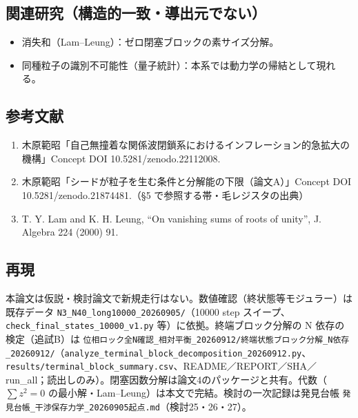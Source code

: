 \documentclass[
  a4paper,
]{ltjsarticle}
\providecommand{\tightlist}{%
  \setlength{\itemsep}{0pt}\setlength{\parskip}{0pt}}
\begin{document}
\subsection{関連研究（構造的一致・導出元でない）}\label{ux95a2ux9023ux7814ux7a76ux69cbux9020ux7684ux4e00ux81f4ux5c0eux51faux5143ux3067ux306aux3044}

\begin{itemize}
\tightlist
\item
  消失和（Lam--Leung）：ゼロ閉塞ブロックの素サイズ分解。
\item
  同種粒子の識別不可能性（量子統計）：本系では動力学の帰結として現れる。
\end{itemize}

\subsection{参考文献}\label{ux53c2ux8003ux6587ux732e}

\begin{enumerate}
\def\labelenumi{\arabic{enumi}.}
\tightlist
\item
  木原範昭「自己無撞着な関係波閉鎖系におけるインフレーション的急拡大の機構」Concept
  DOI 10.5281/zenodo.22112008.
\item
  木原範昭「シードが粒子を生む条件と分解能の下限（論文A）」Concept DOI
  10.5281/zenodo.21874481.（§5 で参照する帯・毛レジスタの出典）
\item
  T. Y. Lam and K. H. Leung, ``On vanishing sums of roots of unity'', J.
  Algebra 224 (2000) 91.
\end{enumerate}

\subsection{再現}\label{ux518dux73fe}

本論文は仮説・検討論文で新規走行はない。数値確認（終状態等モジュラー）は既存データ
\texttt{N3\_N40\_long10000\_20260905/}（10000 step
スイープ、\texttt{check\_final\_states\_10000\_v1.py}
等）に依拠。終端ブロック分解の N 依存の検定（追試B）は
\texttt{位相ロック全N確認\_相対平衡\_20260912/終端状態ブロック分解\_N依存\_20260912/}（\texttt{analyze\_terminal\_block\_decomposition\_20260912.py}、\texttt{results/terminal\_block\_summary.csv}、README／REPORT／SHA／run\_all；読出しのみ）。閉塞因数分解は論文4のパッケージと共有。代数（\(\sum z^2=0\)
の最小解・Lam--Leung）は本文で完結。検討の一次記録は発見台帳
\texttt{発見台帳\_干渉保存力学\_20260905起点.md}（検討25・26・27）。
\end{document}

